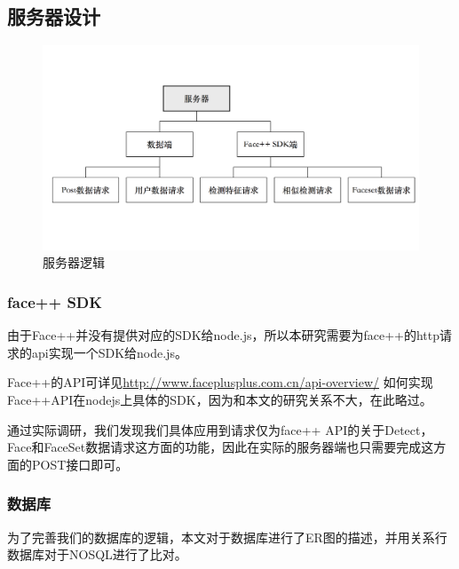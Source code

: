 \subsection{服务器设计}
\begin{figure}[h]
\centering
\includegraphics[width=\textwidth]{img/chap3/server.png}
\caption{服务器逻辑\label{Face++API}}
\end{figure}



\subsubsection{face++ SDK}
由于Face++并没有提供对应的SDK给node.js，所以本研究需要为face++的http请求的api实现一个SDK给node.js。

Face++的API可详见\url{http://www.faceplusplus.com.cn/api-overview/}
如何实现Face++API在nodejs上具体的SDK，因为和本文的研究关系不大，在此略过。

通过实际调研，我们发现我们具体应用到请求仅为face++ API的关于Detect，Face和FaceSet数据请求这方面的功能，因此在实际的服务器端也只需要完成这方面的POST接口即可。


\subsubsection{数据库}
为了完善我们的数据库的逻辑，本文对于数据库进行了ER图的描述，并用关系行数据库对于NOSQL进行了比对。

